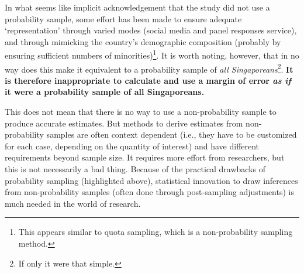 \documentclass[openany]{book}
\let\rmarkdownfootnote\footnote%
\def\footnote{\protect\rmarkdownfootnote}
\begin{document}
In what seems like implicit acknowledgement that the study did not use a
probability sample, some effort has been made to ensure adequate
`representation' through varied modes (social media and panel responses
service), and through mimicking the country's demographic composition
(probably by ensuring sufficient numbers of minorities)\footnote{This
  appears similar to quota sampling, which is a non-probability sampling
  method.}. It is worth noting, however, that in no way does this make
it equivalent to a probability sample of \emph{all
Singaporeans}\footnote{If only it were that simple.}. \textbf{It is
therefore inappropriate to calculate and use a margin of error \emph{as
if} it were a probability sample of all Singaporeans.}

This does not mean that there is no way to use a non-probability sample
to produce accurate estimates. But methods to derive estimates from
non-probability samples are often context dependent (i.e., they have to
be customized for each case, depending on the quantity of interest) and
have different requirements beyond sample size. It requires more effort
from researchers, but this is not necessarily a bad thing. Because of
the practical drawbacks of probability sampling (highlighted above),
statistical innovation to draw inferences from non-probability samples
(often done through post-sampling adjustments) is much needed in the
world of research.
\end{document}

